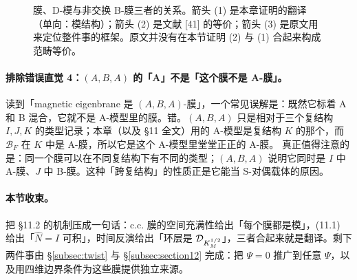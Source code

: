 \begin{figure}[htbp]
\centering
{}
\caption{膜、D-模与非交换 B-膜三者的关系。箭头 (1) 是本章证明的翻译（单向：模结构）；箭头 (2) 是文献 [41] 的等价；箭头 (3) 是原文用来定位整件事的框架。原文并没有在本节证明 (2) 与 (1) 合起来构成范畴等价。}
\label{fig:triangle}
\end{figure}

\paragraph{排除错误直觉 4：\((A,B,A)\) 的「A」不是「这个膜不是 A-膜」。}读到「magnetic eigenbrane 是 \((A,B,A)\)-膜」，一个常见误解是：既然它标着 A 和 B 混合，它就不是 A-模型里的膜。错。\((A,B,A)\) 只是相对于三个复结构 \(I,J,K\) 的类型记录；本章（以及 \S11 全文）用的 A-模型是复结构 \(K\) 的那个，而 \(\mathcal B_F\) 在 \(K\) 中是 A-膜，所以它是这个 A-模型里堂堂正正的 A-膜。\pA{} 真正值得注意的是：同一个膜可以在不同复结构下有不同的类型；\((A,B,A)\) 说明它同时是 \(I\) 中 A-膜、\(J\) 中 B-膜。这种「跨复结构」的性质正是它能当 S-对偶载体的原因。\pA{}

\paragraph{本节收束。}把 \S11.2 的机制压成一句话：c.c. 膜的空间充满性给出「每个膜都是模」，(11.1) 给出「\(\hat N=I\) 可积」，时间反演给出「环层是 \(\mathcal{D}_{K_M^{1/2}}\)」，三者合起来就是翻译。剩下两件事由 \S\ref{subsec:twist} 与 \S\ref{subsec:section12} 完成：把 \(\Psi=0\) 推广到任意 \(\Psi\)，以及用四维边界条件为这些膜提供独立来源。

